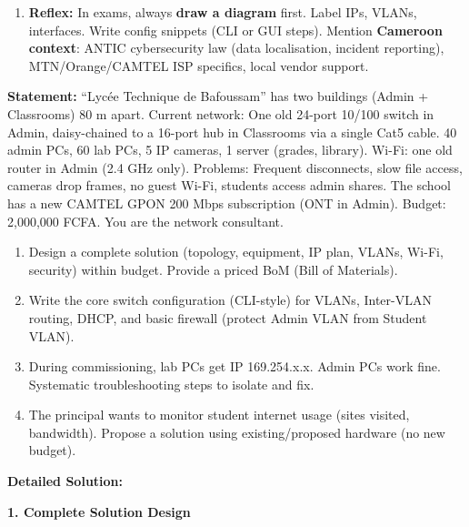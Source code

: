 \documentclass[11pt]{article}
\begin{document}
\begin{methode}
\begin{enumerate}
\begin{enumerate}
      \item \textbf{Use tools:} ping, traceroute, nslookup, ipconfig/ifconfig, arp -a, netstat, Wireshark (capture), cable tester, Wi-Fi analyser.
      \item \textbf{Document fix \& update docs.}
      \end{enumerate}
\item \textbf{Reflex:} In exams, always \textbf{draw a diagram} first. Label IPs, VLANs, interfaces. Write config snippets (CLI or GUI steps). Mention \textbf{Cameroon context}: ANTIC cybersecurity law (data localisation, incident reporting), MTN/Orange/CAMTEL ISP specifics, local vendor support.
\end{enumerate}
\end{methode}

\begin{exoresolu}
\textbf{Statement:} 
``Lycée Technique de Bafoussam'' has two buildings (Admin + Classrooms) 80 m apart. Current network: One old 24-port 10/100 switch in Admin, daisy-chained to a 16-port hub in Classrooms via a single Cat5 cable. 40 admin PCs, 60 lab PCs, 5 IP cameras, 1 server (grades, library). Wi-Fi: one old router in Admin (2.4 GHz only). Problems: Frequent disconnects, slow file access, cameras drop frames, no guest Wi-Fi, students access admin shares.
The school has a new CAMTEL GPON 200 Mbps subscription (ONT in Admin). Budget: 2,000,000 FCFA. You are the network consultant.
\begin{enumerate}
\item Design a complete solution (topology, equipment, IP plan, VLANs, Wi-Fi, security) within budget. Provide a priced BoM (Bill of Materials).
\item Write the core switch configuration (CLI-style) for VLANs, Inter-VLAN routing, DHCP, and basic firewall (protect Admin VLAN from Student VLAN).
\item During commissioning, lab PCs get IP 169.254.x.x. Admin PCs work fine. Systematic troubleshooting steps to isolate and fix.
\item The principal wants to monitor student internet usage (sites visited, bandwidth). Propose a solution using existing/proposed hardware (no new budget).
\end{enumerate}
\tcblower
\textbf{Detailed Solution:}

\textbf{1. Complete Solution Design}


\end{exoresolu}
\end{document}
